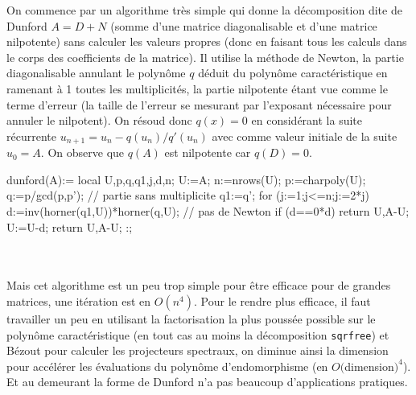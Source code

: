 \documentclass[a4paper,11pt]{article}
\begin{document}
\begin{giacjshere}
On commence par un algorithme tr\`es simple qui donne la d\'ecomposition
dite de Dunford $A=D+N$
(somme d'une matrice diagonalisable et d'une matrice
nilpotente) sans calculer les valeurs propres (donc en faisant
tous les calculs dans le corps des coefficients de la matrice).
Il utilise la m\'ethode de Newton, la partie diagonalisable
annulant le polyn\^ome $q$ d\'eduit du polyn\^ome caract\'eristique 
en ramenant \`a 1 toutes
les multiplicit\'es, la partie nilpotente \'etant vue comme le
terme d'erreur (la taille de l'erreur se mesurant
par l'exposant n\'ecessaire pour annuler le nilpotent). On r\'esoud
donc $q(x)=0$ en consid\'erant la suite r\'ecurrente
$u_{n+1}=u_n-q(u_n)/q'(u_n)$ avec comme valeur initiale de la suite $u_0=A$.
On observe que $q(A)$ est nilpotente car $q(D)=0$.
\begin{giacprog}
dunford(A):={
  local U,p,q,q1,j,d,n;
  U:=A;
  n:=nrows(U);
  p:=charpoly(U);
  q:=p/gcd(p,p'); // partie sans multiplicite
  q1:=q';
  for (j:=1;j<=n;j:=2*j){
    d:=inv(horner(q1,U))*horner(q,U); // pas de Newton
    if (d==0*d) return U,A-U;
    U:=U-d;
  }
  return U,A-U;
}:;
\end{giacprog}
\\
\\
Mais cet algorithme est un peu trop simple pour \^etre efficace pour de
grandes matrices, une it\'eration est en $O(n^4)$.
Pour le rendre plus efficace, il faut travailler un
peu en utilisant la factorisation la plus pouss\'ee possible sur le
polyn\^ome caract\'eristique (en tout cas au moins la d\'ecomposition
\verb|sqrfree|) et B\'ezout pour calculer les projecteurs spectraux,
on diminue ainsi la dimension pour acc\'el\'erer les \'evaluations du
polyn\^ome d'endomorphisme (en $O($dimension$)^4$). Et au demeurant
la forme de Dunford n'a pas beaucoup d'applications pratiques.


\end{giacjshere}
\end{document}
